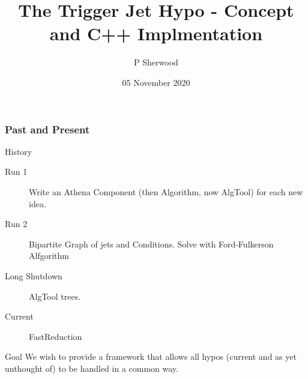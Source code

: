 \documentclass{beamer}
\title{The Trigger Jet Hypo - Concept and C++ Implmentation}
\author{P Sherwood}
\date{05 November 2020}
\begin{document}
\frame{\titlepage}




%	

\frame
{
  \frametitle{Past and  Present}

\begin{block}{History}
\begin{description}
\item[Run 1] Write an Athena Component (then Algorithm, now AlgTool) for each new idea.
\item[Run 2] Bipartite Graph of jets and Conditions. Solve with Ford-Fulkerson Alfgorithm
\item[Long Shutdown] AlgTool trees.
\item[Current] FastReduction
\end{description}
\end{block}

\begin{block}{Goal}
We wish to provide a framework that allows all hypos (current and as yet unthought of) to
be handled in a common way.
\end{block}
 }
\end{document}
